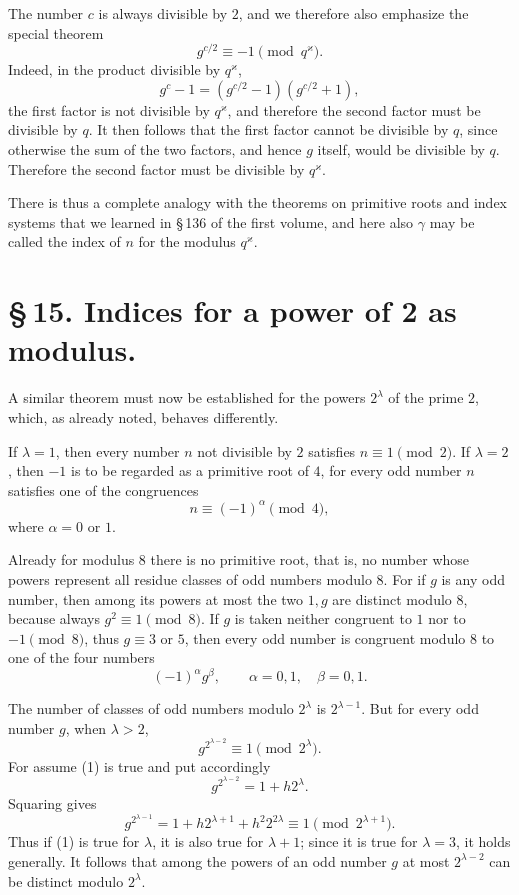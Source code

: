 \documentclass[11pt]{article}
\begin{document}
The number $c$ is always divisible by $2$, and we therefore also emphasize the special theorem
\begin{equation}
g^{c/2}\equiv-1\pmod{q^\varkappa}.
\tag{11}
\end{equation}
Indeed, in the product divisible by $q^\varkappa$,
\[
g^c-1=(g^{c/2}-1)(g^{c/2}+1),
\]
the first factor is not divisible by $q^\varkappa$, and therefore the second factor must be divisible by $q$. It then follows that the first factor cannot be divisible by $q$, since otherwise the sum of the two factors, and hence $g$ itself, would be divisible by $q$. Therefore the second factor must be divisible by $q^\varkappa$.

There is thus a complete analogy with the theorems on primitive roots and index systems that we learned in \S\,136 of the first volume, and here also $\gamma$ may be called the index of $n$ for the modulus $q^\varkappa$.

\section*{\S\,15. Indices for a power of 2 as modulus.}

A similar theorem must now be established for the powers $2^\lambda$ of the prime $2$, which, as already noted, behaves differently.

If $\lambda=1$, then every number $n$ not divisible by $2$ satisfies $n\equiv1\pmod2$. If $\lambda=2$, then $-1$ is to be regarded as a primitive root of $4$, for every odd number $n$ satisfies one of the congruences
\[
n\equiv(-1)^\alpha\pmod4,
\]
where $\alpha=0$ or $1$.

Already for modulus $8$ there is no primitive root, that is, no number whose powers represent all residue classes of odd numbers modulo $8$. For if $g$ is any odd number, then among its powers at most the two $1,g$ are distinct modulo $8$, because always $g^2\equiv1\pmod8$. If $g$ is taken neither congruent to $1$ nor to $-1\pmod8$, thus $g\equiv3$ or $5$, then every odd number is congruent modulo $8$ to one of the four numbers
\[
(-1)^\alpha g^\beta,
\qquad
\alpha=0,1,
\quad
\beta=0,1.
\]

The number of classes of odd numbers modulo $2^\lambda$ is $2^{\lambda-1}$. But for every odd number $g$, when $\lambda>2$,
\begin{equation}
g^{2^{\lambda-2}}\equiv1\pmod{2^\lambda}.
\tag{1}
\end{equation}
For assume (1) is true and put accordingly
\[
g^{2^{\lambda-2}}=1+h2^\lambda.
\]
Squaring gives
\[
g^{2^{\lambda-1}}=1+h2^{\lambda+1}+h^2 2^{2\lambda}
\equiv1\pmod{2^{\lambda+1}}.
\]
Thus if (1) is true for $\lambda$, it is also true for $\lambda+1$; since it is true for $\lambda=3$, it holds generally. It follows that among the powers of an odd number $g$ at most $2^{\lambda-2}$ can be distinct modulo $2^\lambda$.
\end{document}
